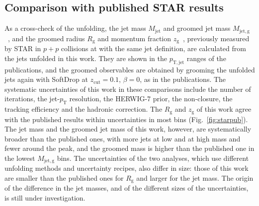  \subsection{Comparison with published STAR results}
As a cross-check of the unfolding, the jet mass \(M_\mathrm{jet}\) and groomed jet mass \(M_\mathrm{jet, g}\)~\cite{STAR:2021lvw}, and the groomed radius \(R_\mathrm{g}\) and momentum fraction \(z_\mathrm{g}\)~\cite{STAR:2020ejj}, previously measured by STAR in \(p+p\) collisions at  with the same jet definition, are calculated from the jets unfolded in this work.
%
They are shown in the \(p_\mathrm{T, jet}\) ranges of the publications, and the groomed observables are obtained by grooming the unfolded jets again with SoftDrop at \(z_\mathrm{cut} = 0.1\), \(\beta = 0\), as in the publications.
%
The systematic uncertainties of this work in these comparisons include the number of iterations, the jet-\(p_\mathrm{T}\) resolution, the HERWIG\mbox{-}7 prior, the non-closure, the tracking efficiency and the hadronic correction.
%
The \(R_\mathrm{g}\) and \(z_\mathrm{g}\) of this work agree with the published results within uncertainties in most bins (Fig.~\ref{fig:starpub}).
%
The jet mass and the groomed jet mass of this work, however, are systematically broader than the published ones, with more jets at low and at high mass and fewer around the peak, and the groomed mass is higher than the published one in the lowest \(M_\mathrm{jet, g}\) bins.
%
The uncertainties of the two analyses, which use different unfolding methods and uncertainty recipes, also differ in size: those of this work are smaller than the published ones for \(R_\mathrm{g}\) and larger for the jet mass.
%
The origin of the difference in the jet masses, and of the different sizes of the uncertainties, is still under investigation.

